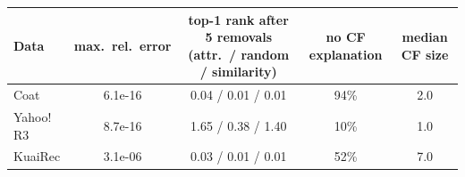 \begin{tabular}{lcccc}
\toprule
Data & max.\ rel.\ error & top-1 rank after 5 removals (attr.\ / random / similarity) & no CF explanation & median CF size\\
\midrule
Coat & 6.1e-16 & 0.04 / 0.01 / 0.01 & 94\% & 2.0\\
Yahoo!\,R3 & 8.7e-16 & 1.65 / 0.38 / 1.40 & 10\% & 1.0\\
KuaiRec & 3.1e-06 & 0.03 / 0.01 / 0.01 & 52\% & 7.0\\
\bottomrule
\end{tabular}
